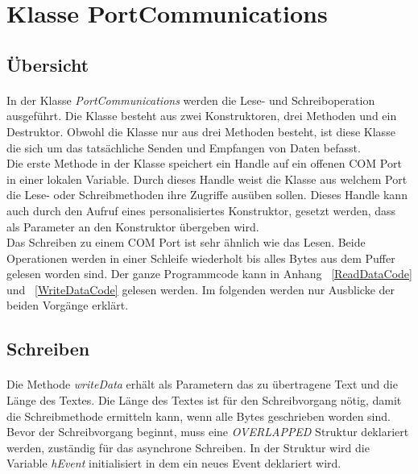 \section{Klasse PortCommunications}
\subsection{Übersicht}
\paragraph{}
In der Klasse \textit{PortCommunications} werden die Lese- und Schreiboperation ausgeführt. Die Klasse besteht aus zwei Konstruktoren, drei Methoden und ein Destruktor. Obwohl die Klasse nur aus drei Methoden besteht, ist diese Klasse die sich um das tatsächliche Senden und Empfangen von Daten befasst.\\

Die erste Methode in der Klasse speichert ein Handle auf ein offenen COM Port in einer lokalen Variable. Durch dieses Handle weist die Klasse aus welchem Port die Lese- oder Schreibmethoden ihre Zugriffe ausüben sollen. Dieses Handle kann auch durch den Aufruf eines personalisiertes Konstruktor, gesetzt werden, dass als Parameter an den Konstruktor übergeben wird.\\

Das Schreiben zu einem COM Port ist sehr ähnlich wie das Lesen. Beide Operationen werden in einer Schleife wiederholt bis alles Bytes aus dem Puffer gelesen worden sind. Der ganze Programmcode kann in Anhang ~\ref{ReadDataCode} und ~\ref{WriteDataCode} gelesen werden. Im folgenden werden nur Ausblicke der beiden Vorgänge erklärt.\\

\subsection{Schreiben}
\paragraph{}
Die Methode \textit{writeData} erhält als Parametern das zu übertragene Text und die Länge des Textes. Die Länge des Textes ist für den Schreibvorgang nötig, damit die Schreibmethode ermitteln kann, wenn alle Bytes geschrieben worden sind. Bevor der Schreibvorgang beginnt, muss eine \textit{OVERLAPPED} Struktur deklariert werden, zuständig für das asynchrone Schreiben. In der Struktur wird die Variable \textit{hEvent} initialisiert in dem ein neues Event deklariert wird.\\

